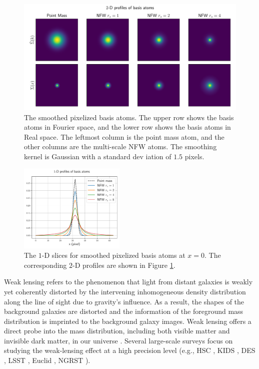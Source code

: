 \documentclass[twocolumn]{aastex63}
\begin{document}
\begin{figure}[!t] \includegraphics[width=1.\textwidth]{nfwlet-atom-2D.pdf}
    \caption{The smoothed pixelized basis atoms. The upper row shows the basis
        atoms in Fourier space, and the lower row shows the basis atoms in Real
        space.  The leftmost column is the point mass atom, and the other
        columns are the multi-scale NFW atoms.  The smoothing kernel is
        Gaussian with a standard dev iation of $1.5$ pixels.
    } \label{fig_atoms2D}
\end{figure}

\begin{figure}
 \includegraphics[width=0.45\textwidth]{nfwlet-atom-1D.pdf}
    \caption{The $1$-D slices for smoothed pixelized basis atoms at $x=0$. The
        corresponding $2$-D profiles are shown in Figure \ref{fig_atoms2D}.
    }
 \label{fig_atoms1D}
\end{figure}

Weak lensing refers to the phenomenon that light from distant galaxies is
weakly yet coherently distorted by the intervening inhomogeneous density
distribution along the line of sight due to gravity's influence.  As a result,
the shapes of the background galaxies are distorted and the information of the
foreground mass distribution is imprinted to the background galaxy images. Weak
lensing offers a direct probe into the mass distribution, including both
visible matter and invisible dark matter, in our universe \citep[see][for
recent reviews]{revKilbinger15,revRachel17}.
Several large-scale surveys focus on studying the weak-lensing effect at a high
precision level (e.g., HSC \citep{HSC1-data}, KIDS \citep{KIDS13}, DES
\citep{DES05}, LSST \citep{LSSTScienceBook}, Euclid \citep{Euclid2011}, NGRST
\citep{WFIRST15}).
\end{document}
